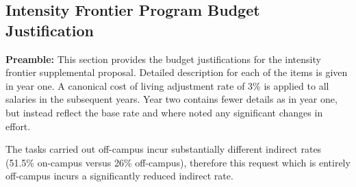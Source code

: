 \subsection{\Large Intensity Frontier Program Budget Justification}
{\bf Preamble:} This section provides the budget justifications for the intensity frontier supplemental proposal.  Detailed description for each of the items is given in year one.  A canonical cost of living adjustment rate of 3\% is applied to all salaries in the subsequent years. Year two contains fewer details as in year one, but instead reflect the base rate and where noted any significant changes in effort.   

The tasks carried out off-campus incur substantially different indirect rates (51.5\% on-campus versus 26\% off-campus), therefore this request which is entirely off-campus incurs a significantly reduced indirect rate.   

